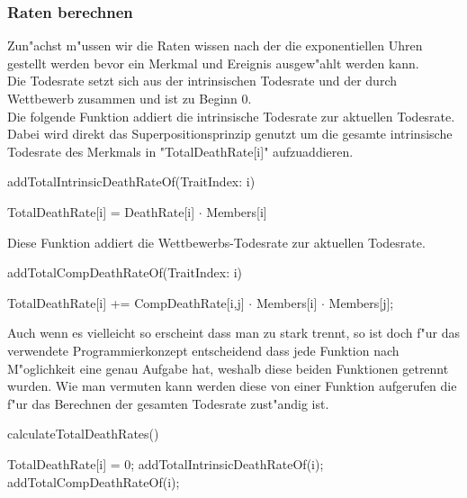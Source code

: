 \documentclass[11pt, a4paper, german]{article}
\begin{document}
	\subsubsection{Raten berechnen}	
	Zun"achst m"ussen wir die Raten wissen nach der die exponentiellen Uhren gestellt werden bevor ein Merkmal und Ereignis ausgew"ahlt werden kann.\\
	Die Todesrate setzt sich aus der intrinsischen Todesrate und der durch Wettbewerb zusammen und ist zu Beginn 0.\\
	
	Die folgende Funktion addiert die intrinsische Todesrate zur aktuellen Todesrate. Dabei wird direkt das Superpositionsprinzip genutzt um die gesamte intrinsische Todesrate des Merkmals in "{}TotalDeathRate[i]"{} aufzuaddieren.
	\begin{algorithm}[H]
		\caption{addTotalIntrinsicDeathRateOf(TraitIndex: i)}
		\begin{algorithmic}[1]
			\STATE TotalDeathRate[i] = DeathRate[i] $ \cdot $ Members[i]
		\end{algorithmic}
	\end{algorithm}
	Diese Funktion addiert die Wettbewerbs-Todesrate zur aktuellen Todesrate.
	\begin{algorithm}[H]
		\caption{addTotalCompDeathRateOf(TraitIndex: i)}
		\begin{algorithmic}[1]
				\STATE TotalDeathRate[i] += CompDeathRate[i,j] $ \cdot $ Members[i] $ \cdot $ Members[j];
			\ENDFOR
		\end{algorithmic}
	\end{algorithm}
	Auch wenn es vielleicht so erscheint dass man zu stark trennt, so ist doch f"ur das verwendete Programmierkonzept entscheidend dass jede Funktion nach M"oglichkeit eine genau Aufgabe hat, weshalb diese beiden Funktionen getrennt wurden. Wie man vermuten kann werden diese von einer Funktion aufgerufen die f"ur das Berechnen der gesamten Todesrate zust"andig ist.
	\begin{algorithm}[H]
		\caption{calculateTotalDeathRates()}
		\begin{algorithmic}[1]
				\STATE TotalDeathRate[i] = 0;
				\STATE addTotalIntrinsicDeathRateOf(i);
				\STATE addTotalCompDeathRateOf(i);
			\ENDFOR
		\end{algorithmic}
	\end{algorithm}
	
\end{document}
